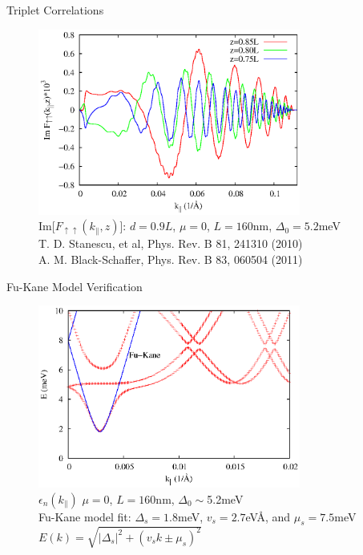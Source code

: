 \documentclass[]{beamer}
\begin{document}
\begin{frame}{Triplet Correlations}
\begin{figure}
\includegraphics[width=3.4in]{include/pwave.eps}\\
{Im}[$F_{\uparrow\uparrow}(k_\parallel,z)$]:
$d=0.9L$, $\mu=0$, $L=160$nm, $\Delta_0=5.2$meV\\
T. D. Stanescu, et al, Phys. Rev. B 81, 241310 (2010)\\
A. M. Black-Schaffer, Phys. Rev. B 83, 060504 (2011)
\end{figure}
\end{frame}





\begin{frame}{Fu-Kane Model Verification}
\begin{figure}
\includegraphics[width=3.4in]{include/levels.eps}\\
$\epsilon_n(k_\parallel)$  
$\mu=0$, $L=160$nm,  $\Delta_0\sim$5.2meV\\
Fu-Kane model fit: $\Delta_s=1.8$meV, $v_s=2.7$eV\AA, and $\mu_s=7.5$meV \\
$E(k)=\sqrt{|\Delta_s|^2+(v_sk \pm\mu_s)^2}$
\end{figure}
\end{frame}
\end{document}
